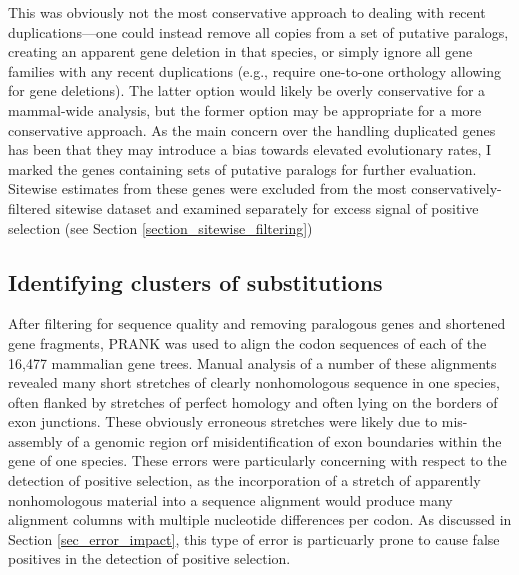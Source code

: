 This was obviously not the most conservative approach to dealing with
recent duplications---one could instead remove all copies from a set
of putative paralogs, creating an apparent gene deletion in that
species, or simply ignore all gene families with any recent
duplications (e.g., require one-to-one orthology allowing for gene
deletions). The latter option would likely be overly conservative for
a mammal-wide analysis, but the former option may be appropriate for a
more conservative approach. As the main concern over the handling
duplicated genes has been that they may introduce a bias towards
elevated evolutionary rates, I marked the genes containing sets of
putative paralogs for further evaluation. Sitewise estimates from
these genes were excluded from the most conservatively-filtered
sitewise dataset and examined separately for excess signal of positive
selection (see Section \ref{section_sitewise_filtering})

\subsection{Identifying clusters of \nsyn substitutions}
\label{section_windows_clustered_subs}

After filtering for sequence quality and removing paralogous genes and
shortened gene fragments, PRANK was used to align the codon sequences
of each of the 16,477 mammalian gene trees. Manual analysis of a
number of these alignments revealed many short stretches of clearly
nonhomologous sequence in one species, often flanked by stretches of
perfect homology and often lying on the borders of exon junctions.
These obviously erroneous stretches were likely due to mis-assembly of
a genomic region orf misidentification of exon boundaries within the
gene of one species. These errors were particularly concerning with
respect to the detection of positive selection, as the incorporation
of a stretch of apparently nonhomologous material into a sequence
alignment would produce many alignment columns with multiple
nucleotide differences per codon. As discussed in Section
\ref{sec_error_impact}, this type of error is particuarly prone to
cause false positives in the detection of positive selection.

